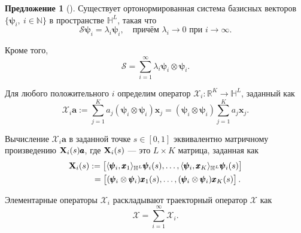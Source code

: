 \documentclass[12pt, specialist, subf
]{disser}
\theoremstyle{definition}
\newtheorem{proposition}{Предложение}
\begin{document}
\begin{proposition}[{\cite[Раздел~3.1]{haghbin2019functionalsingularspectrumanalysis}}]
	Существует ортонормированная система базисных векторов $\{\boldsymbol{\psi}_{i},\ i\in\mathbb{N}\}$ в пространстве $\mathbb{H}^{L}$, такая что
\[
\boldsymbol{\mathcal{S}}\boldsymbol{\psi}_{i} = \lambda_{i}\boldsymbol{\psi}_{i}, \quad \text{причём } \lambda_{i} \to 0 \text{ при } i \to \infty.
\]

Кроме того, 
\[
\boldsymbol{\mathcal{S}} = \sum_{i=1}^{\infty} \lambda_{i} \boldsymbol{\psi}_{i} \otimes \boldsymbol{\psi}_{i}.
\]
\end{proposition}


Для любого положительного $i$ определим оператор $\mathcal{X}_i:\mathbb{R}^K\rightarrow\mathbb{H}^L$, заданный как
\begin{equation}\label{eq: elementary oprator}
	\mathcal{X}_i \pmb{a}:=\sum_{j=1}^K a_j (\pmb{\psi}_i\otimes \pmb{\psi}_i){\pmb x}_j= (\pmb{\psi}_i\otimes \pmb{\psi}_i)\sum_{j=1}^K a_j{\pmb x}_j.
\end{equation}

Вычисление $\mathcal{X}_i \pmb{a}$ в заданной точке $s\in [0,1]$ эквивалентно матричному произведению ${\bf X}_i(s)\pmb{a}$, где ${\bf X}_i(s)$ — это $L \times K$ матрица, заданная как
\begin{align}\label{eq:elementary mat}
	{\bf X}_i(s) & :=
	\begin{bmatrix} \langle\pmb{\psi}_i, {\pmb x}_1\rangle_{\mathbb{H}^L} \pmb{\psi}_i(s), \ldots, \langle\pmb{\psi}_i, {\pmb x}_K\rangle_{\mathbb{H}^L} \pmb{\psi}_i(s) \end{bmatrix}
	\notag            \\ &\ =
	\begin{bmatrix} (\pmb{\psi}_i\otimes \pmb{\psi}_i){\pmb x}_1(s), \ldots, (\pmb{\psi}_i\otimes \pmb{\psi}_i){\pmb x}_K(s) \end{bmatrix}.
\end{align}



Элементарные операторы $\mathcal{X}_i$ раскладывают траекторный оператор $\mathcal{X}$ как
\begin{equation}\label{eq:elementary operators}
	\mathcal{X}=\sum_{i=1}^\infty \mathcal{X}_i.
\end{equation}
\end{document}
